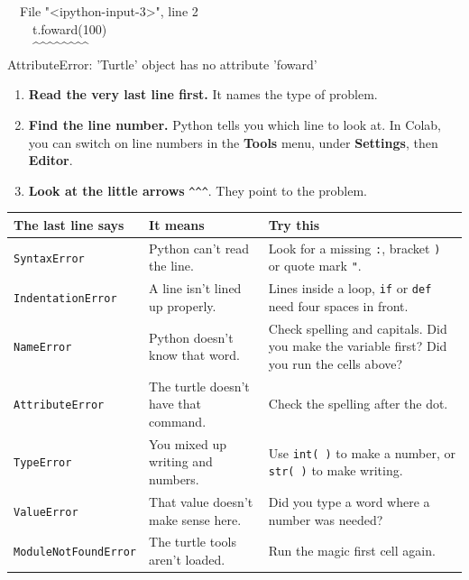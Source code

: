 \documentclass[12pt,a4paper]{article}
\newcommand{\py}{\lstinline[style=inl]}
\begin{document}
\begin{errorbox}
\ \ File "<ipython-input-3>", line 2\\
\ \ \ \ t.foward(100)\\
\ \ \ \ \textasciicircum\textasciicircum\textasciicircum\textasciicircum\textasciicircum\textasciicircum\textasciicircum\textasciicircum\\
AttributeError: 'Turtle' object has no attribute 'foward'
\end{errorbox}

\begin{enumerate}
  \item \textbf{Read the very last line first.} It names the type of problem.
  \item \textbf{Find the line number.} Python tells you which line to look at. In Colab, you can switch on line numbers in the \textbf{Tools} menu, under \textbf{Settings}, then \textbf{Editor}.
  \item \textbf{Look at the little arrows} \texttt{\textasciicircum\textasciicircum\textasciicircum}. They point to the problem.
\end{enumerate}

\small
\renewcommand{\arraystretch}{1.3}
\begin{longtable}{P{5cm} P{4.6cm} P{5.9cm}}
\toprule
\textbf{The last line says} & \textbf{It means} & \textbf{Try this} \\
\midrule
\texttt{SyntaxError} & Python can't read the line. & Look for a missing \texttt{:}, bracket \texttt{)} or quote mark \texttt{"}. \\
\texttt{IndentationError} & A line isn't lined up properly. & Lines inside a loop, \texttt{if} or \texttt{def} need four spaces in front. \\
\texttt{NameError} & Python doesn't know that word. & Check spelling and capitals. Did you make the variable first? Did you run the cells above? \\
\texttt{AttributeError} & The turtle doesn't have that command. & Check the spelling after the dot. \\
\texttt{TypeError} & You mixed up writing and numbers. & Use \py|int( )| to make a number, or \py|str( )| to make writing. \\
\texttt{ValueError} & That value doesn't make sense here. & Did you type a word where a number was needed? \\
\texttt{ModuleNotFoundError} & The turtle tools aren't loaded. & Run the magic first cell again. \\
\bottomrule
\end{longtable}
\normalsize
\end{document}
